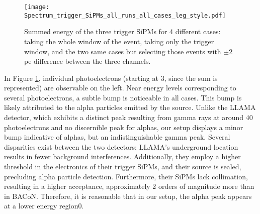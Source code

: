 \documentclass[11pt,a4paper,english,oneside, pdf]{article}
\begin{document}
	\begin{figure}[!h]
		\begin{center}
			\texttt{[image: Spectrum\_trigger\_SiPMs\_all\_runs\_all\_cases\_leg\_style.pdf]}
			\caption{Summed energy of the three trigger SiPMs for 4 different cases: taking the whole window of the event, taking only the trigger window, and the two same cases but selecting those events with $\pm$2 pe difference between the three channels.}
			\label{fig:Spectrum_trigger_SiPMs_all_runs_all_cases}
		\end{center}
	\end{figure}
	
	In Figure \ref{fig:Spectrum_trigger_SiPMs_all_runs_all_cases}, individual photoelectrons (starting at 3, since the sum is represented) are observable on the left. Near energy levels corresponding to several photoelectrons, a subtle bump is noticeable in all cases. This bump is likely attributed to the alpha particles emitted by the source. Unlike the LLAMA detector, which exhibits a distinct peak resulting from gamma rays at around 40 photoelectrons and no discernible peak for alphas, our setup displays a minor bump indicative of alphas, but an indistinguishable gamma peak. Several disparities exist between the two detectors: LLAMA's underground location results in fewer background interferences. Additionally, they employ a higher threshold in the electronics of their trigger SiPMs, and their source is sealed, precluding alpha particle detection. Furthermore, their SiPMs lack collimation, resulting in a higher acceptance, approximately 2 orders of magnitude more than in BACoN. Therefore, it is reasonable that in our setup, the alpha peak appears at a lower energy region0.
\end{document}
